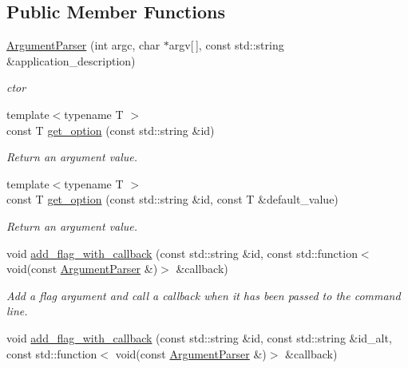 \subsection*{Public Member Functions}
\begin{DoxyCompactItemize}
\item 
\hyperlink{classcppargparse_1_1parser_1_1ArgumentParser_a704fa488168e08c7ae727445c5fa710a}{Argument\+Parser} (int argc, char $\ast$argv\mbox{[}$\,$\mbox{]}, const std\+::string \&application\+\_\+description)
\begin{DoxyCompactList}\small\item\em c\textquotesingle{}tor \end{DoxyCompactList}\item 
{\footnotesize template$<$typename T $>$ }\\const T \hyperlink{classcppargparse_1_1parser_1_1ArgumentParser_a3e8d3ae0eece40b7e62ae6faae5107ed}{get\+\_\+option} (const std\+::string \&id)
\begin{DoxyCompactList}\small\item\em Return an argument value. \end{DoxyCompactList}\item 
{\footnotesize template$<$typename T $>$ }\\const T \hyperlink{classcppargparse_1_1parser_1_1ArgumentParser_a6e13da383b8fdac04a35767abe0f5c32}{get\+\_\+option} (const std\+::string \&id, const T \&default\+\_\+value)
\begin{DoxyCompactList}\small\item\em Return an argument value. \end{DoxyCompactList}\item 
void \hyperlink{classcppargparse_1_1parser_1_1ArgumentParser_aa9abf9b86b7310784d04085cff2a4d3c}{add\+\_\+flag\+\_\+with\+\_\+callback} (const std\+::string \&id, const std\+::function$<$ void(const \hyperlink{classcppargparse_1_1parser_1_1ArgumentParser}{Argument\+Parser} \&)$>$ \&callback)
\begin{DoxyCompactList}\small\item\em Add a flag argument and call a callback when it has been passed to the command line. \end{DoxyCompactList}\item 
void \hyperlink{classcppargparse_1_1parser_1_1ArgumentParser_ac117877909d58e4a18d6a5094c2c6877}{add\+\_\+flag\+\_\+with\+\_\+callback} (const std\+::string \&id, const std\+::string \&id\+\_\+alt, const std\+::function$<$ void(const \hyperlink{classcppargparse_1_1parser_1_1ArgumentParser}{Argument\+Parser} \&)$>$ \&callback)

\end{DoxyCompactItemize}
